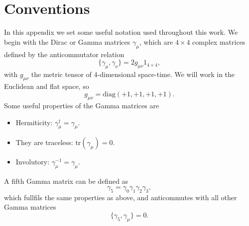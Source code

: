 
\chapter{Conventions}
\label{apex_conventions}

In this appendix we set some useful notation used throughout this work. We begin with the Dirac or Gamma matrices $\gamma_{\mu}$, which are $4\times 4$ complex matrices defined by the anticommutator relation
\begin{equation}
\{\gamma_{\mu},\gamma_{\nu}\}=2g_{\mu\nu}1_{4\times 4},
\end{equation}
with $g_{\mu\nu}$ the metric tensor of 4-dimensional space-time. We will work in the Euclidean and flat space, so
\begin{equation}
g_{\mu\nu}=\textrm{diag}(+1,+1,+1,+1).
\end{equation}
Some useful properties of the Gamma matrices are
\begin{itemize}
\item Hermiticity: $\gamma_{\mu}^{\dagger}=\gamma_{\mu}$.
\item They are traceless: $\textrm{tr}(\gamma_{\mu})=0$.
\item Involutory: $\gamma_{\mu}^{-1}=\gamma_{\mu}$.
\end{itemize}
A fifth Gamma matrix can be defined as
\begin{equation}
\gamma_5=\gamma_0\gamma_1\gamma_2\gamma_3,
\end{equation}
which fullfils the same properties as above, and anticommutes with all other Gamma matrices
\begin{equation}
\{\gamma_5,\gamma_{\mu}\}=0.
\end{equation}

